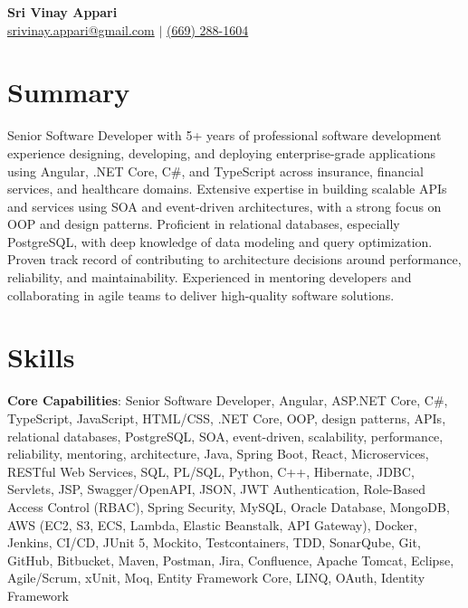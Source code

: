 \documentclass{resume}
\begin{document}
\begin{center}
    {\Huge \textbf{Sri Vinay Appari}}\\[4pt]
    \small
    \href{mailto:srivinay.appari@gmail.com}{srivinay.appari@gmail.com} $|$
    \href{tel:(669) 288-1604}{(669) 288-1604}
\end{center}

\section{Summary}
\begin{itemize}[leftmargin=0pt, itemindent=0pt, labelwidth=0pt, labelsep=0pt, align=left, label={}]%
  \small{\item{
    Senior Software Developer with 5+ years of professional software development experience designing, developing, and deploying enterprise-grade applications using Angular, .NET Core, C\#, and TypeScript across insurance, financial services, and healthcare domains. Extensive expertise in building scalable APIs and services using SOA and event-driven architectures, with a strong focus on OOP and design patterns. Proficient in relational databases, especially PostgreSQL, with deep knowledge of data modeling and query optimization. Proven track record of contributing to architecture decisions around performance, reliability, and maintainability. Experienced in mentoring developers and collaborating in agile teams to deliver high-quality software solutions.
  }}
\end{itemize}

\section{Skills}
\begin{itemize}[leftmargin=0pt, itemindent=0pt, labelwidth=0pt, labelsep=0pt, align=left, label={}]%
  \small{\item{
    \textbf{Core Capabilities}{: Senior Software Developer, Angular, ASP.NET Core, C\#, TypeScript, JavaScript, HTML/CSS, .NET Core, OOP, design patterns, APIs, relational databases, PostgreSQL, SOA, event-driven, scalability, performance, reliability, mentoring, architecture, Java, Spring Boot, React, Microservices, RESTful Web Services, SQL, PL/SQL, Python, C++, Hibernate, JDBC, Servlets, JSP, Swagger/OpenAPI, JSON, JWT Authentication, Role-Based Access Control (RBAC), Spring Security, MySQL, Oracle Database, MongoDB, AWS (EC2, S3, ECS, Lambda, Elastic Beanstalk, API Gateway), Docker, Jenkins, CI/CD, JUnit 5, Mockito, Testcontainers, TDD, SonarQube, Git, GitHub, Bitbucket, Maven, Postman, Jira, Confluence, Apache Tomcat, Eclipse, Agile/Scrum, xUnit, Moq, Entity Framework Core, LINQ, OAuth, Identity Framework}
  }}
\end{itemize}
\end{document}

